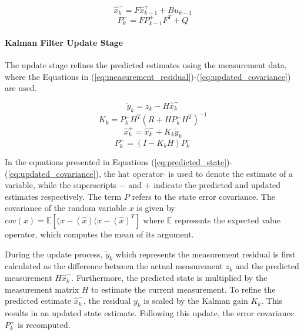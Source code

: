 \begin{equation}
\hat{x}_k^- = F \hat{x}^+_{k-1} + B u_{k-1}
\label{eq:predicted_state}
\end{equation}
\begin{equation}
P_k^- = F P^+_{k-1} F^T + Q
\label{eq:predicted_covariance}
\end{equation}

\paragraph{Kalman Filter Update Stage}\mbox{}

The update stage refines the predicted estimates using the measurement data, where the Equations in (\ref{eq:measurement_residual})-(\ref{eq:updated_covariance}) are used.

\begin{equation}
\tilde{y}_k = z_k - H \hat{x}^-_k
\label{eq:measurement_residual}
\end{equation}
\begin{equation}
K_k = P^-_k H^T \left( R + H P^-_k H^T \right)^{-1}
\label{eq:kalman_gain}
\end{equation}
\begin{equation}
\hat{x}^+_k = \hat{x}^-_k + K_k \tilde{y}_k
\label{eq:updated_state}
\end{equation}
\begin{equation}
P^+_k = (I - K_k H) P^-_k
\label{eq:updated_covariance}
\end{equation}

In the equations presented in Equations (\ref{eq:predicted_state})-(\ref{eq:updated_covariance}), the hat operator $\hat{}$ is used to denote the estimate of a variable, while the superscripts $-$ and $+$ indicate the predicted and updated estimates respectively. The term $P$ refers to the state error covariance. The covariance of the random variable $x$ is given by $cov(x) = \mathbb{E}[(x-(\hat x)(x-(\hat x)^T]$ where $\mathbb{E}$ represents the expected value operator, which computes the mean of its argument.


During the update process, $\tilde{y}_k$ which represents the measurement residual is first calculated as the difference between the actual measurement $z_k$ and the predicted measurement $H\hat{x}^-_k$. Furthermore, the predicted state is multiplied by the measurement matrix $H$ to estimate the current measurement. To refine the predicted estimate $\hat{x}_k^-$, the residual $y_k$ is scaled by the Kalman gain $K_k$. This results in an updated state estimate. Following this update, the error covariance $P_k^+$ is recomputed.


